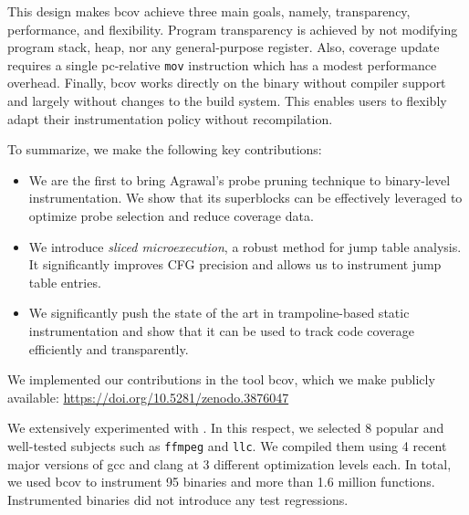 {This design makes \textsf{bcov} achieve three main goals, namely, transparency, performance, and flexibility.
Program transparency is achieved by not modifying program stack, heap, nor any general-purpose register. 
Also, coverage update requires a single pc-relative \texttt{mov} instruction which has a modest performance overhead.
Finally, \textsf{bcov} works directly on the binary without compiler support and largely without changes to the build system. 
This enables users to flexibly adapt their instrumentation policy without recompilation.



To summarize, we make the following key contributions:
\begin{itemize}
    \item We are the first to bring Agrawal's probe pruning technique to binary-level instrumentation.
    We show that its superblocks can be effectively leveraged to optimize probe selection and reduce coverage data.
    
    \item We introduce \textit{sliced microexecution}, a robust method for jump table analysis.
    It significantly improves CFG precision and allows us to instrument jump table entries.
    
    \item We significantly push the state of the art in trampoline-based static instrumentation and show that it can be used to track code coverage efficiently and transparently.
         
\end{itemize}

We implemented our contributions in the tool \textsf{bcov}, which we make publicly available: 
\url{https://doi.org/10.5281/zenodo.3876047}



We extensively experimented with \bcov. 
In this respect, we selected 8 popular and well-tested subjects such as \texttt{ffmpeg} and \texttt{llc}.
We compiled them using 4 recent major versions of \textsf{gcc} and \textsf{clang} at 3 different optimization levels each.
In total, we used \textsf{bcov} to instrument 95 binaries and more than 1.6 million functions.
Instrumented binaries did not introduce any test regressions.

}
